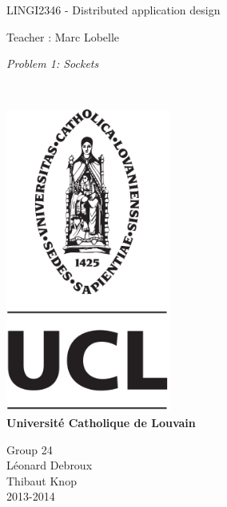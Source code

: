 \documentclass{article}
\begin{document}
\begin{titlepage}
    \begin{center}
        {\huge LINGI2346 - Distributed application design}\\
        \vspace{0.4cm}
        
        {\Large {Teacher : Marc Lobelle}}\\
        \vspace{0.6cm}
        
        {\Large \textit{Problem 1: Sockets}}\\
        \vspace{1.2cm}

        \texttt{}\\
        \vspace{0.2cm}

        \includegraphics[height=10cm]{pageGarde.png}\\
        \vspace{0.1cm}
        {\Large \textbf{Universit\'e Catholique de Louvain}}
        \vspace{0.3cm}

        \vspace{2cm}
        Group 24\\
        \vspace{0.3cm}
        Léonard Debroux\\
        Thibaut Knop\\
        \vspace{0.4cm}
        2013-2014\\
    \end{center}
\end{titlepage}
\end{document}
